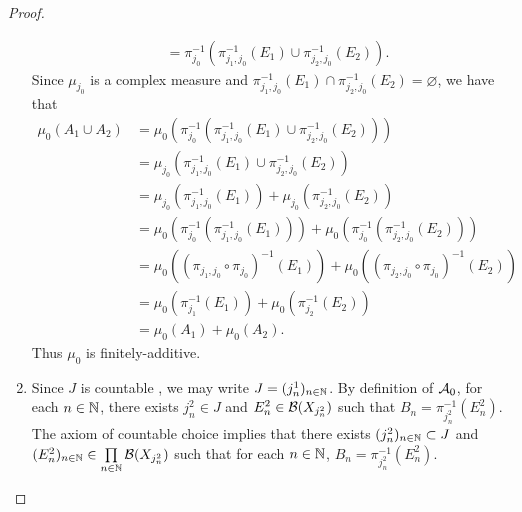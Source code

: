 \documentclass{book}
\begin{document}
\begin{proof}
\begin{enumerate}
\begin{align*}
			& = \pi_{j_0}^{-1}(\pi_{j_1, j_0}^{-1}(E_1) \cup \pi_{j_2, j_0}^{-1}(E_2)).
		\end{align*}
		Since $\mu_{j_0}$ is a complex measure and $\pi_{j_1, j_0}^{-1}(E_1) \cap \pi_{j_2, j_0}^{-1}(E_2) = \varnothing$, we have that 
		\begin{align*}
			\mu_0(A_1 \cup A_2) 
			& = \mu_0(\pi_{j_0}^{-1}(\pi_{j_1, j_0}^{-1}(E_1) \cup \pi_{j_2, j_0}^{-1}(E_2))) \\
			& = \mu_{j_0}(\pi_{j_1, j_0}^{-1}(E_1) \cup \pi_{j_2, j_0}^{-1}(E_2)) \\
			& = \mu_{j_0}(\pi_{j_1, j_0}^{-1}(E_1)) + \mu_{j_0}(\pi_{j_2, j_0}^{-1}(E_2)) \\
			& = \mu_0(\pi_{j_0}^{-1}(\pi_{j_1, j_0}^{-1}(E_1))) + \mu_0(\pi_{j_0}^{-1}(\pi_{j_2, j_0}^{-1}(E_2))) \\
			& = \mu_0((\pi_{j_1, j_0} \circ \pi_{j_0})^{-1}(E_1)) + \mu_0((\pi_{j_2, j_0} \circ \pi_{j_0})^{-1}(E_2)) \\
			& = \mu_0(\pi_{j_1}^{-1}(E_1)) + \mu_0(\pi_{j_2}^{-1}(E_2)) \\
			& = \mu_0(A_1) + \mu_0(A_2).
		\end{align*}
		Thus $\mu_0$ is finitely-additive. 
		\item Since $J$ is countable , we may write $J = (j^1_n)_{n \in \mathbb{N}}$. By definition of $\mathcal{A}_0$, for each $n \in \mathbb{N}$, there exists $j^2_n \in J$ and $E^2_n \in \mathcal{B}(X_{j^2_n})$ such that $B_n = \pi_{j^2_n}^{-1}(E^2_n)$. The axiom of countable choice implies that there exists $(j^2_n)_{n \in \mathbb{N}} \subset J$ and $(E_n^2)_{n \in \mathbb{N}} \in \prod\limits_{n \in \mathbb{N}} \mathcal{B}(X_{j^2_n})$ such that for each $n \in \mathbb{N}$, $B_n = \pi_{j^2_n}^{-1}(E^2_n)$. 
		

\end{enumerate}
\end{proof}
\end{document}
